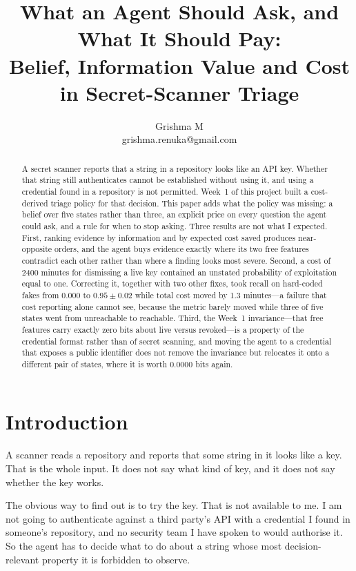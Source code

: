 \documentclass{article}
\title{What an Agent Should Ask, and What It Should Pay:\\Belief, Information Value and Cost in Secret-Scanner Triage}
\author{
Grishma M\\
\emails
grishma.renuka@gmail.com
}
\begin{document}
\maketitle

\begin{abstract}
A secret scanner reports that a string in a repository looks like an API key.
Whether that string still authenticates cannot be established without using it,
and using a credential found in a repository is not permitted. Week~1 of this
project built a cost-derived triage policy for that decision. This paper adds
what the policy was missing: a belief over five states rather than three, an
explicit price on every question the agent could ask, and a rule for when to stop
asking. Three results are not what I expected. First, ranking evidence by
information and by expected cost saved produces near-opposite orders, and the
agent buys evidence exactly where its two free features contradict each other
rather than where a finding looks most severe. Second, a cost of 2400 minutes for
dismissing a live key contained an unstated probability of exploitation equal to
one. Correcting it, together with two other fixes, took recall on hard-coded
fakes from 0.000 to $0.95 \pm 0.02$ while total cost moved by 1.3 minutes---a
failure that cost reporting alone cannot see, because the metric barely moved
while three of five states went from unreachable to reachable. Third, the Week~1 invariance---that free features carry exactly zero
bits about live versus revoked---is a property of the credential format rather
than of secret scanning, and moving the agent to a credential that exposes a
public identifier does not remove the invariance but relocates it onto a
different pair of states, where it is worth 0.0000 bits again.
\end{abstract}

\section{Introduction}

A scanner reads a repository and reports that some string in it looks like a key.
That is the whole input. It does not say what kind of key, and it does not say
whether the key works.

The obvious way to find out is to try the key. That is not available to me. I am
not going to authenticate against a third party's API with a credential I found
in someone's repository, and no security team I have spoken to would authorise
it. So the agent has to decide what to do about a string whose most
decision-relevant property it is forbidden to observe.
\end{document}
